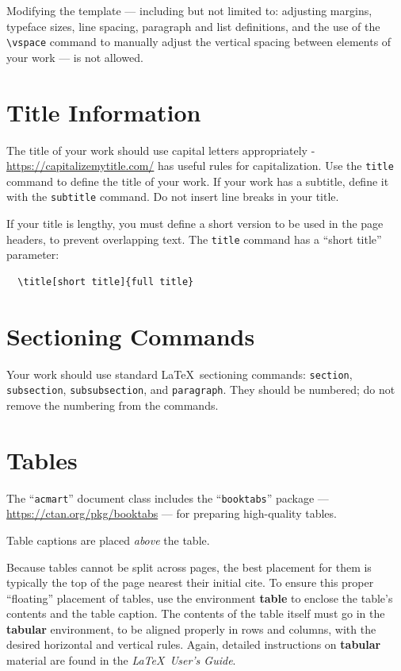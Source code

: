 \documentclass[sigconf]{acmart}
\begin{document}
\iffalse
Modifying the template --- including but not limited to: adjusting
margins, typeface sizes, line spacing, paragraph and list definitions,
and the use of the \verb|\vspace| command to manually adjust the
vertical spacing between elements of your work --- is not allowed.

\section{Title Information}

The title of your work should use capital letters appropriately -
\url{https://capitalizemytitle.com/} has useful rules for
capitalization. Use the {\verb|title|} command to define the title of
your work. If your work has a subtitle, define it with the
{\verb|subtitle|} command.  Do not insert line breaks in your title.

If your title is lengthy, you must define a short version to be used
in the page headers, to prevent overlapping text. The \verb|title|
command has a ``short title'' parameter:
\begin{verbatim}
  \title[short title]{full title}
\end{verbatim}

\section{Sectioning Commands}

Your work should use standard \LaTeX\ sectioning commands:
\verb|section|, \verb|subsection|, \verb|subsubsection|, and
\verb|paragraph|. They should be numbered; do not remove the numbering
from the commands.

\section{Tables}

The ``\verb|acmart|'' document class includes the ``\verb|booktabs|''
package --- \url{https://ctan.org/pkg/booktabs} --- for preparing
high-quality tables.

Table captions are placed {\itshape above} the table.

Because tables cannot be split across pages, the best placement for
them is typically the top of the page nearest their initial cite.  To
ensure this proper ``floating'' placement of tables, use the
environment \textbf{table} to enclose the table's contents and the
table caption.  The contents of the table itself must go in the
\textbf{tabular} environment, to be aligned properly in rows and
columns, with the desired horizontal and vertical rules.  Again,
detailed instructions on \textbf{tabular} material are found in the
\textit{\LaTeX\ User's Guide}.
\end{document}

